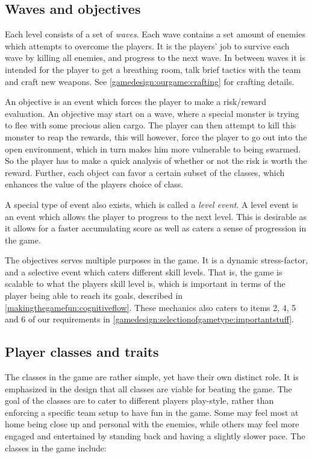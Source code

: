\subsection{Waves and objectives}\label{gamedesign:ourgame:objectives}
Each level consists of a set of \emph{waves}. Each wave contains a set amount of enemies which attempts to overcome the players. It is the players' job to survive each wave by killing all enemies, and progress to the next wave. In between waves it is intended for the player to get a breathing room, talk brief tactics with the team and craft new weapons. See \ref{gamedesign:ourgame:crafting} for crafting details. 

An objective is an event which forces the player to make a risk/reward evaluation. 
An objective may start on a wave, where a special monster is trying to flee with some precious alien cargo. 
The player can then attempt to kill this monster to reap the rewards, this will however, force the player to go out into the open environment, which in turn makes him more vulnerable to being swarmed. So the player has to make a quick analysis of whether or not the risk is worth the reward.
Further, each object can favor a certain subset of the classes, which enhances the value of the players choice of class.

A special type of event also exists, which is called a \emph{level event}. A level event is an event which allows the player to progress to the next level. This is desirable as it allows for a faster accumulating score as well as caters a sense of progression in the game.

The objectives serves multiple purposes in the game. It is a dynamic stress-factor, and a selective event which caters different skill levels. 
That is, the game is scalable to what the players skill level is, which is important in terms of the player being able to reach its goals, described in \ref{makingthegamefun:cognitiveflow}. 
These mechanics also caters to items 2, 4, 5 and 6 of our requirements in \ref{gamedesign:selectionofgametype:importantstuff}.

\subsection{Player classes and traits}\label{gamedesign:ourgame:classes}
The classes in the game are rather simple, yet have their own distinct role.
It is emphasized in the design that all classes are viable for beating the game.
The goal of the classes are to cater to different players play-style, rather than enforcing a specific team setup to have fun in the game.
Some may feel most at home being close up and personal with the enemies, while others may feel more engaged and entertained by standing back and having a slightly slower pace.
The classes in the game include:

